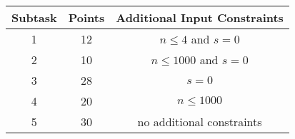 \begin{center}
\renewcommand{\arraystretch}{1.5}
\begin{tabular}{|c|c|c|}
\hline
Subtask & Points & Additional Input Constraints\\
\hline
1 &  12 & $n \le 4$ and $s = 0$ \\
\hline
2 & 10 &  $n \le 1000$ and $s = 0$ \\
\hline
3 & 28 & $s = 0$ \\
\hline
4 & 20 & $n \le 1000$ \\
\hline
5 & 30 & no additional constraints \\
\hline
\end{tabular}
\end{center}